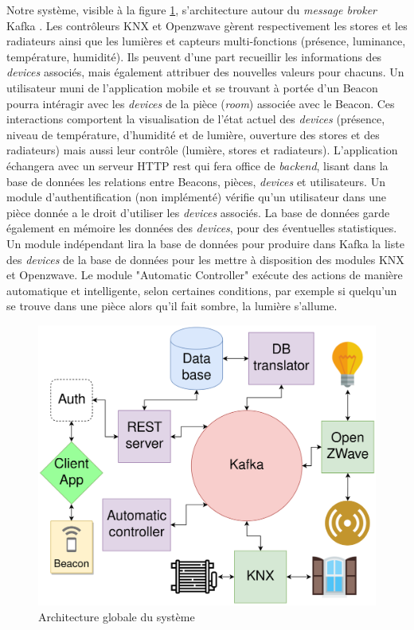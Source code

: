 Notre système, visible à la figure \ref{architecture}, s'architecture autour du \textit{message broker} Kafka \cite{kafka}. Les contrôleurs KNX et Openzwave gèrent respectivement les stores et les radiateurs ainsi que les lumières et capteurs multi-fonctions (présence, luminance, température, humidité). Ils peuvent d'une part recueillir les informations des \textit{devices} associés, mais également attribuer des nouvelles valeurs pour chacuns. Un utilisateur muni de l'application mobile et se trouvant à portée d'un Beacon pourra intéragir avec les \textit{devices} de la pièce (\textit{room}) associée avec le Beacon. Ces interactions comportent la visualisation de l'état actuel des \textit{devices} (présence, niveau de température, d'humidité et de lumière, ouverture des stores et des radiateurs) mais aussi leur contrôle (lumière, stores et radiateurs). L'application échangera avec un serveur HTTP \acrshort{rest} qui fera office de \textit{backend}, lisant dans la base de données les relations entre Beacons, pièces, \textit{devices} et utilisateurs. Un module d'authentification (non implémenté) vérifie qu'un utilisateur dans une pièce donnée a le droit d'utiliser les \textit{devices} associés. La base de données garde également en mémoire les données des \textit{devices}, pour des éventuelles statistiques. Un module indépendant lira la base de données pour produire dans Kafka la liste des \textit{devices} de la base de données pour les mettre à disposition des modules KNX et Openzwave. Le module "Automatic Controller" exécute des actions de manière automatique et intelligente, selon certaines conditions, par exemple si quelqu'un se trouve dans une pièce alors qu'il fait sombre, la lumière s'allume.

\begin{figure}
    \begin{center}
        \includegraphics[width=1\textwidth]{img/architecture.png}
    \end{center}
    \caption{Architecture globale du système}
    \label{architecture}
\end{figure}
